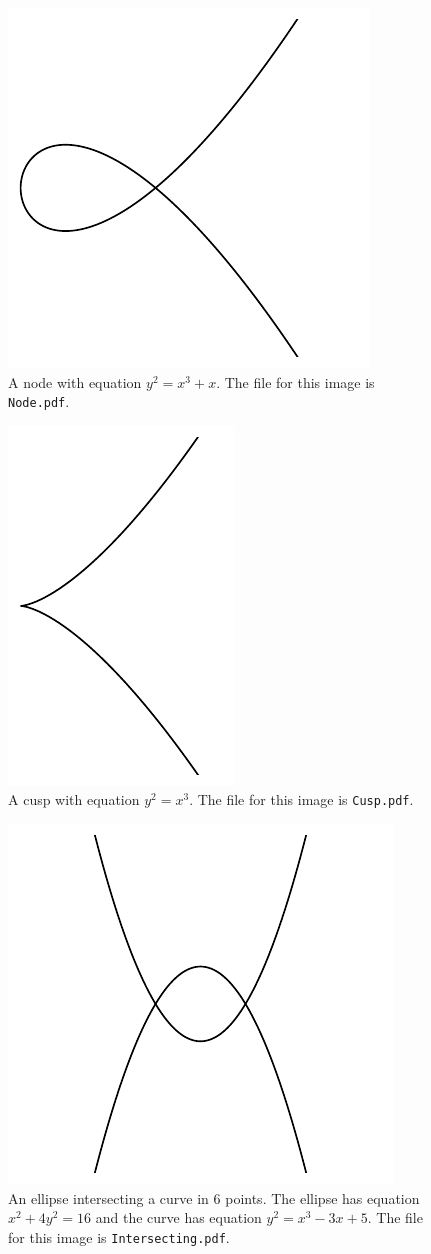 \documentclass{amsart}
\numberwithin{equation}{section}
\numberwithin{thm}{section}
\theoremstyle{definition}
\numberwithin{defn}{section}
\numberwithin{ntn}{section}
\numberwithin{conj}{section}
\numberwithin{exmp}{section}
\numberwithin{rem}{section}
\theoremstyle{remark}
\begin{document}
\begin{figure}
\centering
\includegraphics[width=0.4\linewidth]{Node/Node}
\caption{A node with equation $ y^{2} = x^{3} + x $. The file for this image is \texttt{Node.pdf}.}
\label{fig:Node}
\end{figure}

\begin{figure}
\centering
\includegraphics[width=0.4\linewidth]{Cusp/Cusp}
\caption{A cusp with equation $ y^{2} = x^{3} $. The file for this image is \texttt{Cusp.pdf}.}
\label{fig:Cusp}
\end{figure}


\begin{figure}
\centering
\includegraphics[width=0.4\linewidth]{Intersecting/Intersecting}
\caption{An ellipse intersecting a curve in 6 points. The ellipse has equation $ x^{2} + 4 y^{2} = 16 $ and the curve has equation $ y^{2} = x^{3} - 3 x + 5 $. The file for this image is \texttt{Intersecting.pdf}.}
\label{fig:Intersecting}
\end{figure}
\end{document}

